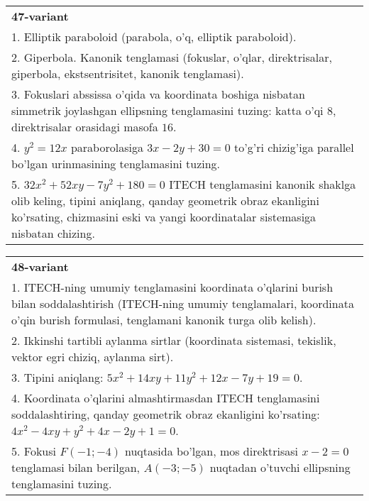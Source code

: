 \documentclass{article}
\begin{document}
\begin{tabular}{m{17cm}}
\textbf{47-variant}\\
1. Elliptik paraboloid (parabola, o'q, elliptik paraboloid).\\

2. Giperbola. Kanonik tenglamasi (fokuslar, o'qlar, direktrisalar, giperbola, ekstsentrisitet, kanonik tenglamasi).\\

3. Fokuslari abssissa o'qida va koordinata boshiga nisbatan simmetrik joylashgan ellipsning tenglamasini tuzing: katta o'qi $8$, direktrisalar orasidagi masofa $16$.\\

4. $y^{2} = 12x$ paraborolasiga $3x - 2y + 30 = 0$ to'g'ri chizig'iga parallel bo'lgan urinmasining tenglamasini tuzing.  \\

5. $32x^{2} + 52xy - 7y^{2} + 180 = 0$ ITECH tenglamasini kanonik shaklga olib keling, tipini aniqlang, qanday geometrik obraz ekanligini ko'rsating, chizmasini eski va yangi koordinatalar sistemasiga nisbatan chizing.  
\end{tabular}
\vspace{1cm}


\begin{tabular}{m{17cm}}
\textbf{48-variant}\\
1. ITECH-ning umumiy tenglamasini koordinata o'qlarini burish bilan soddalashtirish (ITECH-ning umumiy tenglamalari, koordinata o'qin burish formulasi, tenglamani kanonik turga olib kelish).\\

2. Ikkinshi tartibli aylanma sirtlar (koordinata sistemasi, tekislik, vektor egri chiziq, aylanma sirt).\\

3. Tipini aniqlang: $5x^{2}+14xy+11y^{2}+12x-7y+19=0$.\\

4. Koordinata o'qlarini almashtirmasdan ITECH tenglamasini soddalashtiring, qanday geometrik obraz ekanligini ko'rsating: $4x^{2} - 4xy + y^{2} + 4x - 2y + 1 = 0$.  \\

5. Fokusi $F( - 1; - 4)$ nuqtasida bo'lgan, mos direktrisasi $x - 2 = 0$ tenglamasi bilan berilgan, $A( - 3; - 5)$ nuqtadan o'tuvchi ellipsning tenglamasini tuzing.  
\end{tabular}
\vspace{1cm}
\end{document}

